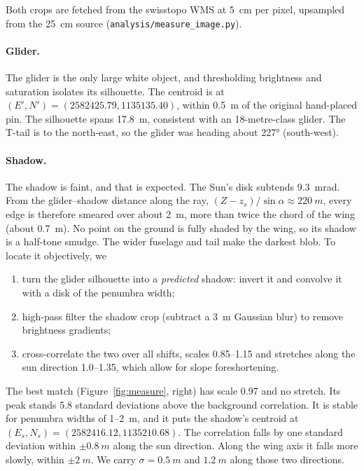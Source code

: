 \documentclass[11pt,a4paper]{article}
\newcommand{\code}[1]{\texttt{#1}}
\begin{document}
Both crops are fetched from the swisstopo WMS at \SI{5}{cm} per pixel, upsampled from the
\SI{25}{cm} source (\code{analysis/measure\_image.py}).

\paragraph{Glider.} The glider is the only large white object, and thresholding brightness
and saturation isolates its silhouette. The centroid is at
$(E',N') = (\num{2582425.79}, \num{1135135.40})$, within \SI{0.5}{m} of the original
hand-placed pin. The silhouette spans \SI{17.8}{m}, consistent with an 18-metre-class glider.
The T-tail is to the north-east, so the glider was heading about \ang{227} (south-west).

\paragraph{Shadow.} The shadow is faint, and that is expected.
The Sun's disk subtends \SI{9.3}{mrad}. From the glider--shadow distance along the ray, $(Z-z_s)/\sin\alpha\approx\SI{220}{m}$,
every edge is therefore smeared over about \SI{2}{m}, more than twice the chord of the wing (about
\SI{0.7}{m}). No point on the ground is fully shaded by the wing, so its shadow is a half-tone smudge. The
wider fuselage and tail make the darkest blob. To locate it objectively, we
\begin{enumerate}
  \item turn the glider silhouette into a \emph{predicted} shadow: invert it and convolve it
        with a disk of the penumbra width;
  \item high-pass filter the shadow crop (subtract a \SI{3}{m} Gaussian blur) to remove
        brightness gradients;
  \item cross-correlate the two over all shifts, scales 0.85--1.15 and stretches along the sun
        direction 1.0--1.35, which allow for slope foreshortening.
\end{enumerate}
The best match (Figure~\ref{fig:measure}, right) has scale 0.97 and no stretch. Its peak stands
5.8 standard deviations above the background correlation. It is stable for penumbra widths of
1--\SI{2}{m}, and it puts the shadow's centroid at $(E_s,N_s)=(\num{2582416.12},\num{1135210.68})$.
The correlation falls by one standard deviation within $\pm\SI{0.8}{m}$ along the sun direction.
Along the wing axis it falls more slowly, within $\pm\SI{2}{m}$. We carry
$\sigma=\SI{0.5}{m}$ and $\SI{1.2}{m}$ along those two directions.
\end{document}
